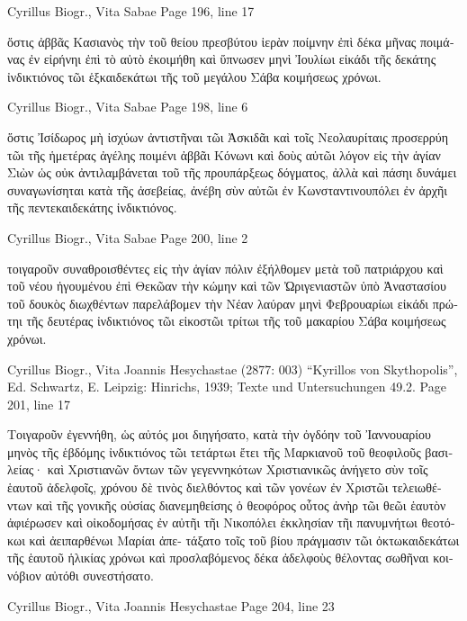 \documentclass[12pt,letterpaper,twoside,final]{memoir}
\begin{document}
\begin{greek}
Cyrillus Biogr., Vita Sabae 
Page 196, line 17

                                                           ὅστις 
ἀββᾶς Κασιανὸς τὴν τοῦ θείου πρεσβύτου ἱερὰν ποίμνην ἐπὶ δέκα 
μῆνας ποιμάνας ἐν εἰρήνηι ἐπὶ τὸ αὐτὸ ἐκοιμήθη καὶ ὕπνωσεν μηνὶ 
Ἰουλίωι εἰκάδι τῆς δεκάτης ἰνδικτιόνος τῶι ἑξκαιδεκάτωι τῆς τοῦ 
μεγάλου Σάβα κοιμήσεως χρόνωι. 



Cyrillus Biogr., Vita Sabae 
Page 198, line 6

                                                       ὅστις Ἰσίδωρος   
μὴ ἰσχύων ἀντιστῆναι τῶι Ἀσκιδᾶι καὶ τοῖς Νεολαυρίταις προσερρύη 
τῶι τῆς ἡμετέρας ἀγέλης ποιμένι ἀββᾶι Κόνωνι καὶ δοὺς αὐτῶι 
λόγον εἰς τὴν ἁγίαν Σιὼν ὡς οὐκ ἀντιλαμβάνεται τοῦ τῆς προυπάρξεως 
δόγματος, ἀλλὰ καὶ πάσηι δυνάμει συναγωνίσηται κατὰ τῆς ἀσεβείας, 
ἀνέβη σὺν αὐτῶι ἐν Κωνσταντινουπόλει ἐν ἀρχῆι τῆς πεντεκαιδεκάτης 
ἰνδικτιόνος. 



Cyrillus Biogr., Vita Sabae 
Page 200, line 2

                                              τοιγαροῦν συναθροισθέντες 
εἰς τὴν ἁγίαν πόλιν ἐξήλθομεν μετὰ τοῦ πατριάρχου καὶ τοῦ νέου 
ἡγουμένου ἐπὶ Θεκῶαν τὴν κώμην καὶ τῶν Ὠριγενιαστῶν ὑπὸ   
Ἀναστασίου τοῦ δουκὸς διωχθέντων παρελάβομεν τὴν Νέαν λαύραν 
μηνὶ Φεβρουαρίωι εἰκάδι πρώτηι τῆς δευτέρας ἰνδικτιόνος τῶι 
εἰκοστῶι τρίτωι τῆς τοῦ μακαρίου Σάβα κοιμήσεως χρόνωι. 



Cyrillus Biogr., Vita Joannis Hesychastae (2877: 003)
“Kyrillos von Skythopolis”, Ed. Schwartz, E.
Leipzig: Hinrichs, 1939; Texte und Untersuchungen 49.2.
Page 201, line 17

Τοιγαροῦν ἐγεννήθη, ὡς αὐτός μοι διηγήσατο, κατὰ τὴν ὀγδόην 
τοῦ Ἰαννουαρίου μηνὸς τῆς ἑβδόμης ἰνδικτιόνος τῶι τετάρτωι ἔτει 
τῆς Μαρκιανοῦ τοῦ θεοφιλοῦς βασιλείας· καὶ Χριστιανῶν ὄντων 
τῶν γεγεννηκότων Χριστιανικῶς ἀνήγετο σὺν τοῖς ἑαυτοῦ ἀδελφοῖς, 
χρόνου δὲ τινὸς διελθόντος καὶ τῶν γονέων ἐν Χριστῶι τελειωθέντων 
καὶ τῆς γονικῆς οὐσίας διανεμηθείσης ὁ θεοφόρος οὗτος ἀνὴρ τῶι 
θεῶι ἑαυτὸν ἀφιέρωσεν καὶ οἰκοδομήσας ἐν αὐτῆι τῆι Νικοπόλει 
ἐκκλησίαν τῆι πανυμνήτωι θεοτόκωι καὶ ἀειπαρθένωι Μαρίαι ἀπε-  
τάξατο τοῖς τοῦ βίου πράγμασιν τῶι ὀκτωκαιδεκάτωι τῆς ἑαυτοῦ 
ἡλικίας χρόνωι καὶ προσλαβόμενος δέκα ἀδελφοὺς θέλοντας σωθῆναι 
κοινόβιον αὐτόθι συνεστήσατο. 



Cyrillus Biogr., Vita Joannis Hesychastae 
Page 204, line 23


\end{greek}
\end{document}
